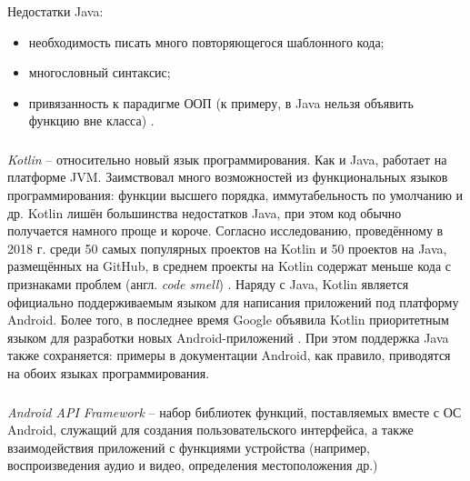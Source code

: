 Недостатки Java:
\begin{itemize}
	\item необходимость писать много повторяющегося шаблонного кода;
	\item многословный синтаксис;
	\item привязанность к парадигме ООП (к примеру, в Java нельзя объявить функцию вне класса) \cite{java_in_21_minutes}.
\end{itemize}

\subsubsection{}
\label{subsub:theory_and_motivation:tools:kotlin}

\textit{Kotlin} -- относительно новый язык программирования.
Как и Java, работает на платформе JVM.
Заимствовал много возможностей из функциональных языков программирования: функции высшего порядка, иммутабельность по умолчанию и др.
Kotlin лишён большинства недостатков Java, при этом код обычно получается намного проще и короче.
Согласно исследованию, проведённому в 2018 г. среди 50 самых популярных проектов на Kotlin и 50 проектов на Java, размещённых на GitHub, в среднем проекты на Kotlin содержат меньше кода с признаками проблем (англ. \textit{code smell}) \cite{java_vs_kotlin_2018}.
Наряду с Java, Kotlin является официально поддерживаемым языком для написания приложений под платформу Android.
Более того, в последнее время Google объявила Kotlin приоритетным языком для разработки новых Android-приложений \cite{android_kotlin_first}.
При этом поддержка Java также сохраняется: примеры в документации Android, как правило, приводятся на обоих языках программирования.

\subsubsection{}
\label{subsub:theory_and_motivation:tools:android_api_framework}

\textit{Android API Framework} -- набор библиотек функций, поставляемых вместе с ОС Android, служащий для создания пользовательского интерфейса, а также взаимодействия приложений с функциями устройства (например, воспроизведения аудио и видео, определения местоположения др.)

\subsubsection{}
\label{subsub:theory_and_motivation:tools:gradle}

